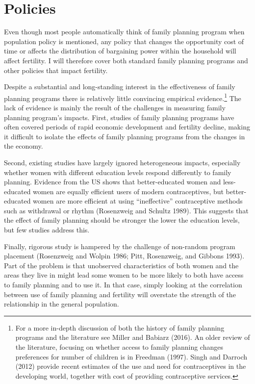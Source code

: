 \documentclass[]{article}
\begin{document}
\section{Policies}\label{policies}

Even though most people automatically think of family planning program when population policy is mentioned, any policy that changes the opportunity cost of time or affects the distribution of bargaining power within the household will affect fertility. I will therefore cover both standard family planning programs and other policies that impact fertility.

Despite a substantial and long-standing interest in the effectiveness of family planning programs there is relatively little convincing empirical evidence.\footnote{For a more in-depth discussion of both the history of family planning programs and the literature see Miller and Babiarz (2016). An older review of the literature, focusing on whether access to family planning changes preferences for number of children is in Freedman (1997). Singh and Darroch (2012) provide recent estimates of the use and need for contraceptives in the developing world, together with cost of providing contraceptive services.} The lack of evidence is mainly the result of the challenges in measuring family planning program's impacts. First, studies of family planning programs have often covered periods of rapid economic development and fertility decline, making it difficult to isolate the effects of family planning programs from the changes in the economy.

Second, existing studies have largely ignored heterogeneous impacts, especially whether women with different education levels respond differently to family planning. Evidence from the US shows that better-educated women and less-educated women are equally efficient users of modern contraceptives, but better-educated women are more efficient at using ``ineffective'' contraceptive methods such as withdrawal or rhythm (Rosenzweig and Schultz 1989). This suggests that the effect of family planning should be stronger the lower the education levels, but few studies address this.

Finally, rigorous study is hampered by the challenge of non-random program placement (Rosenzweig and Wolpin 1986; Pitt, Rosenzweig, and Gibbons 1993). Part of the problem is that unobserved characteristics of both women and the areas they live in might lead some women to be more likely to both have access to family planning and to use it. In that case, simply looking at the correlation between use of family planning and fertility will overstate the strength of the relationship in the general population.
\end{document}
